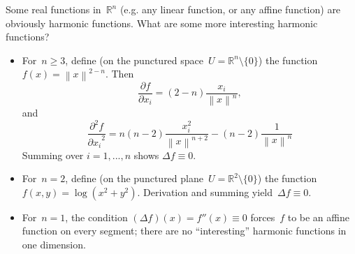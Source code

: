 \documentclass[12pt]{article}
\newcommand{\norm}[1]{\left\|#1\right\|}
\begin{document}
Some real functions in~$\mathbb{R}^n$ (e.g. any linear function, or any affine function) are obviously harmonic functions.  What are some more interesting harmonic functions?

\begin{itemize}
\item
For~$n\ge 3$, define (on the punctured space~$U=\mathbb{R}^n \setminus \{0\}$) the function~$f(x)=\norm{x}^{2-n}$. Then
$$
\frac{\partial f}{\partial x_i} = (2-n) \frac{x_i}{\norm{x}^n},
$$
and
$$
\frac{\partial^2 f}{{\partial x_i}^2} =
n(n-2)\frac{x_i^2}{\norm{x}^{n+2}} - (n-2)\frac{1}{\norm{x}^n}
$$
Summing over $i=1,...,n$ shows $\Delta f\equiv 0$.
\item
For~$n=2$, define (on the punctured plane~$U=\mathbb{R}^2 \setminus \{0\}$) the function~$f(x,y)=\log(x^2+y^2)$.  Derivation and summing yield~$\Delta f\equiv 0$.
\item
For~$n=1$, the condition $(\Delta f)(x)=f''(x)\equiv 0$ forces~$f$ to be an affine function on every segment; there are no ``interesting'' harmonic functions in one dimension.
\end{itemize}
\end{document}
